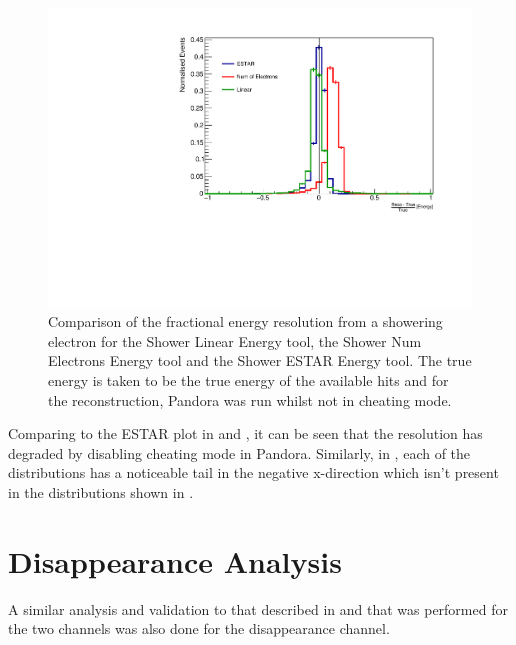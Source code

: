 \begin{figure}[h!]
    \centering
    \includegraphics[width = \largefigwidth]{figures-chap4/non_cheat/ESTAR_plane2_frac_res.pdf}
    \caption[Fractional resolution of the shower energy with Pandora being run not in cheating mode.]{Comparison of the fractional energy resolution from a showering electron for the Shower Linear Energy tool, the Shower Num Electrons Energy tool and the Shower ESTAR Energy tool. The true energy is taken to be the true energy of the available hits and for the reconstruction, Pandora was run whilst not in cheating mode.}
    \label{fig:frac_res_no_cheat}
\end{figure}

Comparing  to the ESTAR plot in  and , it can be seen that the resolution has degraded by disabling cheating mode in Pandora. Similarly, in , each of the distributions has a noticeable tail in the negative x-direction which isn't present in the distributions shown in .


\chapter{\texorpdfstring{\numu Disappearance Analysis}{numu Disappearance Analysis}}\label{app:numu_disapp}

A similar analysis and validation to that described in   and  that was performed for the two \nue channels was also done for the \numu disappearance channel.

